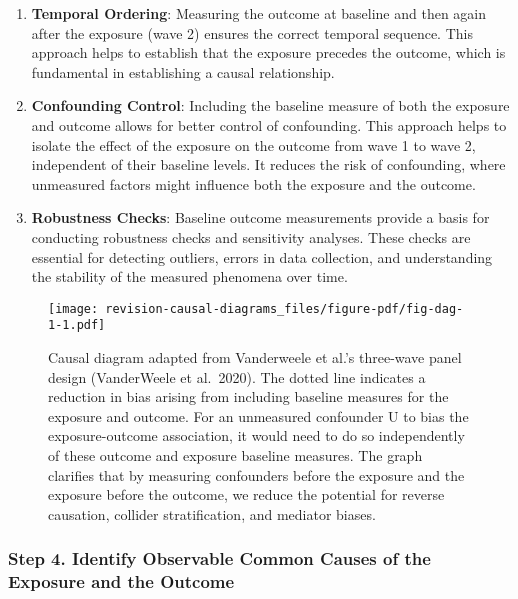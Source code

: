 \documentclass[
  singlecolumn,
  9pt]{article}
\begin{document}
\begin{enumerate}
\def\labelenumi{\arabic{enumi}.}
\item
  \textbf{Temporal Ordering}: Measuring the outcome at baseline and then
  again after the exposure (wave 2) ensures the correct temporal
  sequence. This approach helps to establish that the exposure precedes
  the outcome, which is fundamental in establishing a causal
  relationship.
\item
  \textbf{Confounding Control}: Including the baseline measure of both
  the exposure and outcome allows for better control of confounding.
  This approach helps to isolate the effect of the exposure on the
  outcome from wave 1 to wave 2, independent of their baseline levels.
  It reduces the risk of confounding, where unmeasured factors might
  influence both the exposure and the outcome.
\item
  \textbf{Robustness Checks}: Baseline outcome measurements provide a
  basis for conducting robustness checks and sensitivity analyses. These
  checks are essential for detecting outliers, errors in data
  collection, and understanding the stability of the measured phenomena
  over time.
\end{enumerate}

\begin{figure}

{\centering \texttt{[image: revision-causal-diagrams\_files/figure-pdf/fig-dag-1-1.pdf]}

}

\caption{\label{fig-dag-1}Causal diagram adapted from Vanderweele et
al.'s three-wave panel design (VanderWeele et al.~2020). The dotted line
indicates a reduction in bias arising from including baseline measures
for the exposure and outcome. For an unmeasured confounder U to bias the
exposure-outcome association, it would need to do so independently of
these outcome and exposure baseline measures. The graph clarifies that
by measuring confounders before the exposure and the exposure before the
outcome, we reduce the potential for reverse causation, collider
stratification, and mediator biases.}

\end{figure}

\subsubsection{Step 4. Identify Observable Common Causes of the Exposure
and the
Outcome}\label{step-4.-identify-observable-common-causes-of-the-exposure-and-the-outcome}
\end{document}
